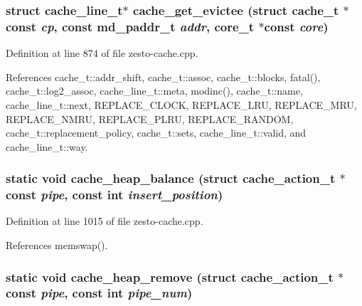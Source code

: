 \subsubsection[{cache\_\-get\_\-evictee}]{\setlength{\rightskip}{0pt plus 5cm}struct {\bf cache\_\-line\_\-t}$\ast$ cache\_\-get\_\-evictee (struct {\bf cache\_\-t} $\ast$const  {\em cp}, \/  const {\bf md\_\-paddr\_\-t} {\em addr}, \/  {\bf core\_\-t} $\ast$const  {\em core})\hspace{0.3cm}{\tt  [read]}}\label{zesto-cache_8cpp_64ef5d6d0aef624c6534b1aae0416f96}




Definition at line 874 of file zesto-cache.cpp.

References cache\_\-t::addr\_\-shift, cache\_\-t::assoc, cache\_\-t::blocks, fatal(), cache\_\-t::log2\_\-assoc, cache\_\-line\_\-t::meta, modinc(), cache\_\-t::name, cache\_\-line\_\-t::next, REPLACE\_\-CLOCK, REPLACE\_\-LRU, REPLACE\_\-MRU, REPLACE\_\-NMRU, REPLACE\_\-PLRU, REPLACE\_\-RANDOM, cache\_\-t::replacement\_\-policy, cache\_\-t::sets, cache\_\-line\_\-t::valid, and cache\_\-line\_\-t::way.
\subsubsection[{cache\_\-heap\_\-balance}]{\setlength{\rightskip}{0pt plus 5cm}static void cache\_\-heap\_\-balance (struct {\bf cache\_\-action\_\-t} $\ast$const  {\em pipe}, \/  const int {\em insert\_\-position})\hspace{0.3cm}{\tt  [static]}}\label{zesto-cache_8cpp_0784d914ca0e1dc0f651a456830f94ed}




Definition at line 1015 of file zesto-cache.cpp.

References memswap().
\subsubsection[{cache\_\-heap\_\-remove}]{\setlength{\rightskip}{0pt plus 5cm}static void cache\_\-heap\_\-remove (struct {\bf cache\_\-action\_\-t} $\ast$const  {\em pipe}, \/  const int {\em pipe\_\-num})\hspace{0.3cm}{\tt  [static]}}\label{zesto-cache_8cpp_672e06f81a893ac6af2c4fd4948069ed}





